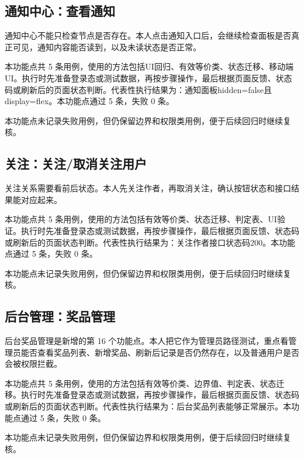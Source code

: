 \documentclass[bwprint]{report}
\begin{document}
\subsection{通知中心：查看通知}

通知中心不能只检查节点是否存在。本人点击通知入口后，会继续检查面板是否真正可见，通知内容能否读到，以及未读状态是否正常。

本功能点共 5 条用例，使用的方法包括UI回归、有效等价类、状态迁移、移动端UI。执行时先准备登录态或测试数据，再按步骤操作，最后根据页面反馈、状态码或刷新后的页面状态判断。代表性执行结果为：通知面板hidden=false且display=flex。本功能点通过 5 条，失败 0 条。

本功能点未记录失败用例，但仍保留边界和权限类用例，便于后续回归时继续复核。

\subsection{关注：关注/取消关注用户}

关注关系需要看前后状态。本人先关注作者，再取消关注，确认按钮状态和接口结果能对应起来。

本功能点共 5 条用例，使用的方法包括有效等价类、状态迁移、判定表、UI验证。执行时先准备登录态或测试数据，再按步骤操作，最后根据页面反馈、状态码或刷新后的页面状态判断。代表性执行结果为：关注作者接口状态码200。本功能点通过 5 条，失败 0 条。

本功能点未记录失败用例，但仍保留边界和权限类用例，便于后续回归时继续复核。

\subsection{后台管理：奖品管理}

后台奖品管理是新增的第 16 个功能点。本人把它作为管理员路径测试，重点看管理员能否查看奖品列表、新增奖品、刷新后记录是否仍然存在，以及普通用户是否会被权限拦截。

本功能点共 5 条用例，使用的方法包括有效等价类、边界值、判定表、状态迁移。执行时先准备登录态或测试数据，再按步骤操作，最后根据页面反馈、状态码或刷新后的页面状态判断。代表性执行结果为：后台奖品列表能够正常展示。本功能点通过 5 条，失败 0 条。

本功能点未记录失败用例，但仍保留边界和权限类用例，便于后续回归时继续复核。
\end{document}
